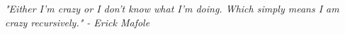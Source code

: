 \documentclass[11pt]{article}
\begin{document}
\vspace{0.5cm} %
\noindent \textit{"Either I'm crazy or I don't know what I'm doing. Which simply means I am crazy recursively." - Erick Mafole}

\end{document}
